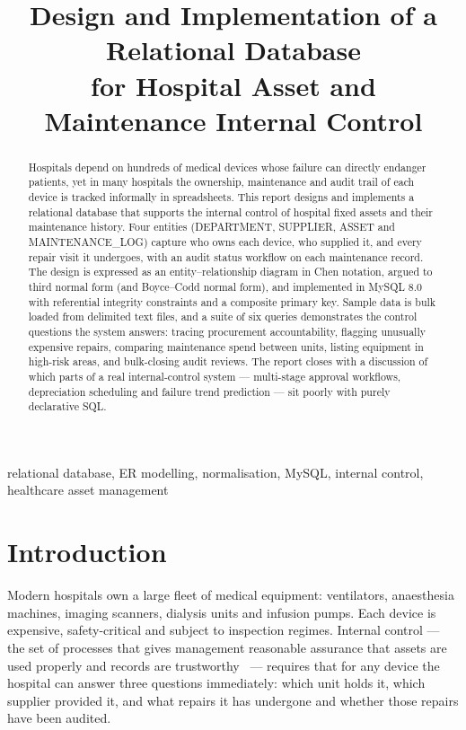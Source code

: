 \documentclass[conference]{IEEEtran}
\begin{document}
\title{Design and Implementation of a Relational Database\\
for Hospital Asset and Maintenance Internal Control}

\author{
}

\maketitle

\begin{abstract}
Hospitals depend on hundreds of medical devices whose failure can directly
endanger patients, yet in many hospitals the ownership, maintenance and audit
trail of each device is tracked informally in spreadsheets. This report
designs and implements a relational database that supports the internal
control of hospital fixed assets and their maintenance history. Four entities
(DEPARTMENT, SUPPLIER, ASSET and MAINTENANCE\_LOG) capture who owns each
device, who supplied it, and every repair visit it undergoes, with an audit
status workflow on each maintenance record. The design is expressed as an
entity--relationship diagram in Chen notation, argued to third normal form
(and Boyce--Codd normal form), and implemented in MySQL 8.0 with referential
integrity constraints and a composite primary key. Sample data is bulk loaded from delimited text files,
and a suite of six queries demonstrates the control questions the system
answers: tracing procurement accountability, flagging unusually expensive
repairs, comparing maintenance spend between units, listing equipment in
high-risk areas, and bulk-closing audit reviews. The report closes with a
discussion of which parts of a real internal-control system --- multi-stage
approval workflows, depreciation scheduling and failure trend prediction ---
sit poorly with purely declarative SQL.
\end{abstract}

\begin{IEEEkeywords}
relational database, ER modelling, normalisation, MySQL, internal control,
healthcare asset management
\end{IEEEkeywords}

\section{Introduction}
Modern hospitals own a large fleet of medical equipment: ventilators,
anaesthesia machines, imaging scanners, dialysis units and infusion pumps.
Each device is expensive, safety-critical and subject to inspection regimes.
Internal control --- the set of processes that gives management reasonable
assurance that assets are used properly and records are trustworthy~\cite{iso} ---
requires that for any device the hospital can answer three questions
immediately: which unit holds it, which supplier provided it, and what
repairs it has undergone and whether those repairs have been audited.
\end{document}

